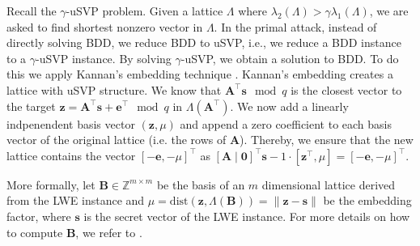 Recall the $\gamma$-uSVP problem. Given a lattice $\Lambda$ where $\lambda_2(\Lambda) > \gamma \lambda_1(\Lambda)$, we are asked to find shortest nonzero vector in $\Lambda$.
In the primal attack, instead of directly solving BDD, we reduce BDD to uSVP, i.e., we reduce a BDD instance to a $\gamma$-uSVP instance. By solving $\gamma$-uSVP, we obtain a solution to BDD.
To do this we apply Kannan's embedding technique \cite{Kan87}. %
Kannan's embedding creates a lattice with uSVP structure. We know that $\mathbf{A}^\intercal \mathbf{s}\mod q$ is the closest vector to the target $\mathbf{z} =\mathbf{A}^\intercal \mathbf{s} + \mathbf{e}^\intercal \mod q$ in $\Lambda(\mathbf{A}^\intercal)$. We now add a linearly indpenendent basis vector  $(\mathbf{z}, \mu)$ and append a zero coefficient to each basis vector of the original lattice (i.e. the rows of $\mathbf{A}$). Thereby, we ensure that the new lattice contains the vector $[-\mathbf{e}, -\mu]^\intercal$ as $[\mathbf{A} \mid \mathbf{0}]^\intercal \mathbf{s} - 1 \cdot [\mathbf{z}^\intercal, \mu] = [-\mathbf{e}, -\mu]^\intercal$.

More formally, let $\mathbf{B} \in \mathbb{Z}^{m \times m}$ be the basis of an $m$ dimensional lattice derived from the LWE instance and $\mu = \text{dist}(\mathbf{z}, \Lambda(\mathbf{B})) = \| \mathbf{z} - \mathbf{s}\|$ be the embedding factor, where $\mathbf{s}$ is the secret vector of the LWE instance. For more details on how to compute $\mathbf{B}$, we refer to \cite{AFG13}. %

